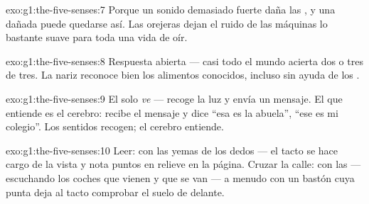 \begin{solution}{exo:g1:the-five-senses:7}
Porque un sonido demasiado fuerte daña las , y una  dañada
puede quedarse así. Las orejeras dejan el ruido de las máquinas lo
bastante suave para toda una vida de oír.
\end{solution}

\begin{solution}{exo:g1:the-five-senses:8}
Respuesta abierta --- casi todo el mundo acierta dos o tres de tres.
La nariz reconoce bien los alimentos conocidos, incluso sin ayuda de
los .
\end{solution}

\begin{solution}{exo:g1:the-five-senses:9}
El  solo \emph{ve} --- recoge la luz y envía un mensaje. El que
entiende es el cerebro: recibe el mensaje y dice ``esa es la abuela'',
``ese es mi colegio''. Los sentidos recogen; el cerebro entiende.
\end{solution}

\begin{solution}{exo:g1:the-five-senses:10}
Leer: con las yemas de los dedos --- el tacto se hace cargo de la
vista y nota puntos en relieve en la página. Cruzar la calle: con las
 --- escuchando los coches que vienen y que se van --- a menudo
con un bastón cuya punta deja al tacto comprobar el suelo de delante.
\end{solution}

